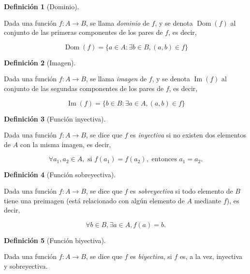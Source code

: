 \documentclass[
  a4paper,
]{scrreport}
\theoremstyle{definition}
\theoremstyle{plain}
\theoremstyle{plain}
\theoremstyle{plain}
\theoremstyle{definition}
\newtheorem{definition}{Definición}[chapter]
\theoremstyle{remark}
\begin{document}
\begin{definition}[Dominio]\protect\hypertarget{def-dominio-funcion}{}\label{def-dominio-funcion}

Dada una función \(f:A\rightarrow B\), se llama \emph{dominio} de \(f\),
y se denota \(\operatorname{Dom}(f)\) al conjunto de las primeras
componentes de los pares de \(f\), es decir,

\[\operatorname{Dom}(f) = \{a\in A: \exists b\in B, (a,b)\in f\}\]

\end{definition}

\begin{definition}[Imagen]\protect\hypertarget{def-imagen-funcion}{}\label{def-imagen-funcion}

Dada una función \(f:A\rightarrow B\), se llama \emph{imagen} de \(f\),
y se denota \(\operatorname{Im}(f)\) al conjunto de las segundas
componentes de los pares de \(f\), es decir,

\[\operatorname{Im}(f) = \{b\in B: \exists a\in A, (a,b)\in f\}\]

\end{definition}

\begin{definition}[Función
inyectiva]\protect\hypertarget{def-funcion-inyectiva}{}\label{def-funcion-inyectiva}

Dada una función \(f:A\rightarrow B\), se dice que \(f\) es
\emph{inyectiva} si no existen dos elementos de \(A\) con la misma
imagen, es decir,

\[\forall a_1, a_2 \in A, \mbox{ si } f(a_1) = f(a_2), \mbox{ entonces } a_1 = a_2.\]

\end{definition}

\begin{definition}[Función
sobreyectiva]\protect\hypertarget{def-funcion-sobreyectiva}{}\label{def-funcion-sobreyectiva}

Dada una función \(f:A\rightarrow B\), se dice que \(f\) es
\emph{sobreyectiva} si todo elemento de \(B\) tiene una preimagen (está
relacionado con algún elemento de \(A\) mediante \(f\)), es decir,

\[\forall b \in B, \exists a\in A, f(a) = b.\]

\end{definition}

\begin{definition}[Función
biyectiva]\protect\hypertarget{def-funcion-biyectiva}{}\label{def-funcion-biyectiva}

Dada una función \(f:A\rightarrow B\), se dice que \(f\) es
\emph{biyectiva}, si \(f\) es, a la vez, inyectiva y sobreyectiva.

\end{definition}
\end{document}
